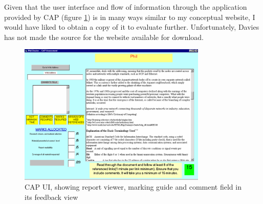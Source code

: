 \documentclass[a4paper,11pt]{report}
\begin{document}
Given that the user interface and flow of information through the application provided by CAP (figure \ref{fig:cap}) is in many ways similar to my conceptual website, I would have liked to obtain a copy of it to evaluate further. Unfortunately, Davies has not made the source for the website available for download.\par
\begin{figure}[ht]
\centering
\includegraphics[width=0.8\textwidth]{fig/CAP.png}
\caption{CAP UI, showing report viewer, marking guide and comment field in its feedback view}
\label{fig:cap}
\end{figure}
\end{document}
